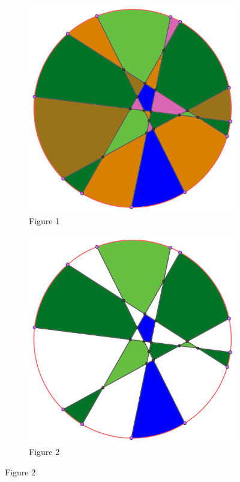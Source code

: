 \documentclass{article}
\begin{document}
\begin{enumerate}
{\begin{figure}[!ht]
\begin{subfigure}[b]{0.45\textwidth}
\includegraphics[width=\textwidth]{four_colour_1.png}
\caption{Figure 1}
\end{subfigure}
%
\begin{subfigure}[b]{0.45\textwidth}
\includegraphics[width=\textwidth]{four_colour_2.png}
\caption{Figure 2}
\end{subfigure}


\end{figure}}
\end{enumerate}
\end{document}

